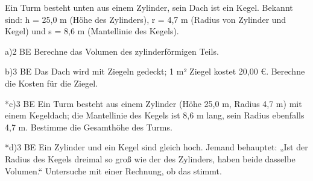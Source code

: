 \documentclass[11pt]{article}
\begin{document}
\begin{pfaufg}{}{}{}
Ein Turm besteht unten aus einem Zylinder, sein Dach ist ein Kegel. Bekannt sind: h = 25,0 m (Höhe des Zylinders), r = 4,7 m (Radius von Zylinder und Kegel) und s = 8,6 m (Mantellinie des Kegels).
\par\smallskip\noindent {}\par
\end{pfaufg}
\begin{pfaufg}{}{a)}{2 BE}
Berechne das Volumen des zylinderförmigen Teils.
\end{pfaufg}
\begin{pfaufg}{}{b)}{3 BE}
Das Dach wird mit Ziegeln gedeckt; 1 m² Ziegel kostet 20,00 €. Berechne die Kosten für die Ziegel.
\end{pfaufg}
\begin{pfaufg}{}{*c)}{3 BE}
Ein Turm besteht aus einem Zylinder (Höhe 25,0 m, Radius 4,7 m) mit einem Kegeldach; die Mantellinie des Kegels ist 8,6 m lang, sein Radius ebenfalls 4,7 m. Bestimme die Gesamthöhe des Turms.
\end{pfaufg}
\begin{pfaufg}{}{*d)}{3 BE}
Ein Zylinder und ein Kegel sind gleich hoch. Jemand behauptet: „Ist der Radius des Kegels dreimal so groß wie der des Zylinders, haben beide dasselbe Volumen.“ Untersuche mit einer Rechnung, ob das stimmt.
\end{pfaufg}
\end{document}
